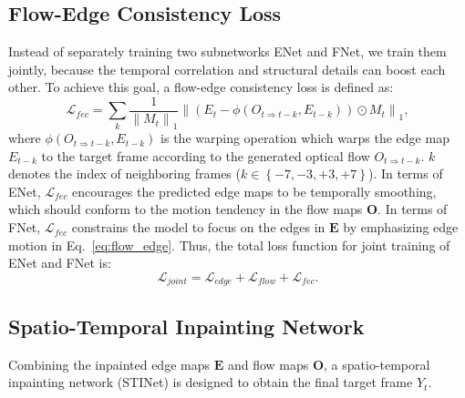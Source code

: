 \subsection{Flow-Edge Consistency Loss}

Instead of separately training two subnetworks ENet and FNet, we train them jointly, because the temporal correlation and structural details can boost each other.
To achieve this goal, a flow-edge consistency loss is defined as:
%
\begin{equation}
	\label{eq:flow_edge}
	\mathcal{L}_{fec}=\sum_{k}\frac{1}{\left\|M_{t} \right\|_1}\left\|(E_{t}-\phi(O_{t\Rightarrow t-k},E_{t-k}))\odot M_{t}\right\|_1,
\end{equation}
where $\phi(O_{t\Rightarrow t-k},E_{t-k})$ is the warping operation which warps the edge map $E_{t-k}$ to the target frame according to the generated optical flow $O_{t\Rightarrow t-k}$.
$k$ denotes the index of neighboring frames ($k\in \left\{-7,-3,+3,+7 \right\}$). 
In terms of ENet, $\mathcal{L}_{fec}$ encourages the predicted edge maps to be temporally smoothing, which should conform to the motion tendency in the flow maps $\boldsymbol{O}$. 
In terms of FNet, $\mathcal{L}_{fec}$ constrains the model to focus on the edges in $\boldsymbol{E}$ by emphasizing edge motion in Eq.~\ref{eq:flow_edge}. 
Thus, the total loss function for joint training of ENet and FNet is:
\begin{equation}
	\label{eq:flow}
	\mathcal{L}_{joint}=\mathcal{L}_{edge}+\mathcal{L}_{flow}+ \mathcal{L}_{fec}.
\end{equation}







\subsection{Spatio-Temporal Inpainting Network}

Combining the inpainted edge maps $\boldsymbol{E}$ and flow maps $\boldsymbol{O}$, a spatio-temporal inpainting network (STINet) is designed to obtain the final target frame $Y_t$.


